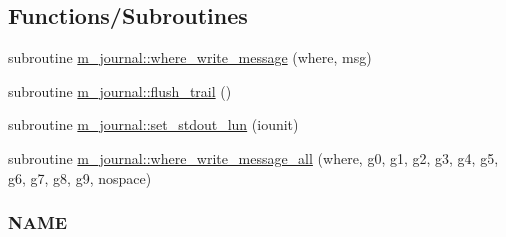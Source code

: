 \subsection*{Functions/\+Subroutines}
\begin{DoxyCompactItemize}
\item 
subroutine \mbox{\hyperlink{namespacem__journal_a21238c3fc7731703c75eb39233ab529e}{m\+\_\+journal\+::where\+\_\+write\+\_\+message}} (where, msg)
\item 
subroutine \mbox{\hyperlink{namespacem__journal_a24b891eded8ca585a6a72ab0eef7016c}{m\+\_\+journal\+::flush\+\_\+trail}} ()
\item 
subroutine \mbox{\hyperlink{namespacem__journal_a8388800481a5e7ca022b52cfc56b9daf}{m\+\_\+journal\+::set\+\_\+stdout\+\_\+lun}} (iounit)
\item 
subroutine \mbox{\hyperlink{namespacem__journal_a25d0f5da7f7e84e22ab0a583447412b1}{m\+\_\+journal\+::where\+\_\+write\+\_\+message\+\_\+all}} (where, g0, g1, g2, g3, g4, g5, g6, g7, g8, g9, nospace)
\begin{DoxyCompactList}\small\item\em \subsubsection*{N\+A\+ME}


\end{DoxyCompactList}
\end{DoxyCompactItemize}
